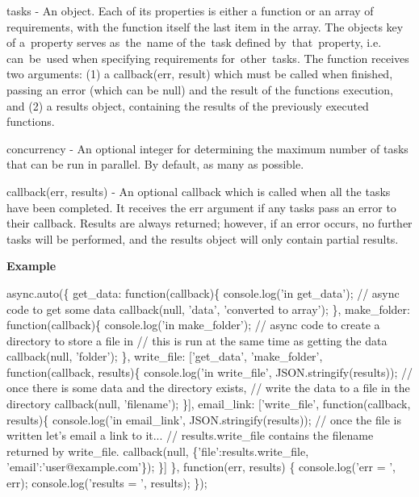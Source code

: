\begin{DoxyItemize}
\item {\ttfamily tasks} -\/ An object. Each of its properties is either a function or an array of requirements, with the function itself the last item in the array. The object\textquotesingle{}s key of a property serves as the name of the task defined by that property, i.\+e. can be used when specifying requirements for other tasks. The function receives two arguments\+: (1) a {\ttfamily callback(err, result)} which must be called when finished, passing an {\ttfamily error} (which can be {\ttfamily null}) and the result of the function\textquotesingle{}s execution, and (2) a {\ttfamily results} object, containing the results of the previously executed functions.
\item {\ttfamily concurrency} -\/ An optional {\ttfamily integer} for determining the maximum number of tasks that can be run in parallel. By default, as many as possible.
\item {\ttfamily callback(err, results)} -\/ An optional callback which is called when all the tasks have been completed. It receives the {\ttfamily err} argument if any {\ttfamily tasks} pass an error to their callback. Results are always returned; however, if an error occurs, no further {\ttfamily tasks} will be performed, and the results object will only contain partial results.
\end{DoxyItemize}

{\bfseries Example}


\begin{DoxyCode}
async.auto(\{
    get\_data: function(callback)\{
        console.log('in get\_data');
        // async code to get some data
        callback(null, 'data', 'converted to array');
    \},
    make\_folder: function(callback)\{
        console.log('in make\_folder');
        // async code to create a directory to store a file in
        // this is run at the same time as getting the data
        callback(null, 'folder');
    \},
    write\_file: ['get\_data', 'make\_folder', function(callback, results)\{
        console.log('in write\_file', JSON.stringify(results));
        // once there is some data and the directory exists,
        // write the data to a file in the directory
        callback(null, 'filename');
    \}],
    email\_link: ['write\_file', function(callback, results)\{
        console.log('in email\_link', JSON.stringify(results));
        // once the file is written let's email a link to it...
        // results.write\_file contains the filename returned by write\_file.
        callback(null, \{'file':results.write\_file, 'email':'user@example.com'\});
    \}]
\}, function(err, results) \{
    console.log('err = ', err);
    console.log('results = ', results);
\});
\end{DoxyCode}


